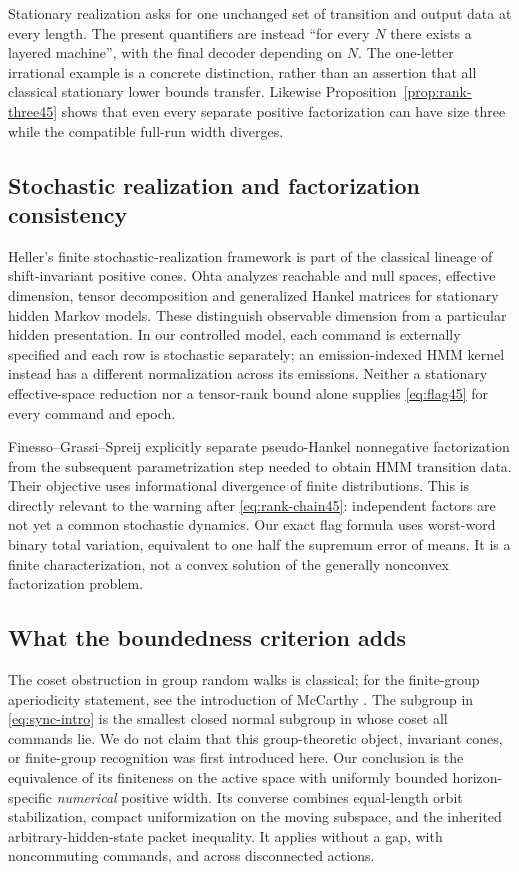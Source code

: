 Stationary realization asks for one unchanged set of transition and output data at every length. The present quantifiers are instead ``for every $N$ there exists a layered machine'', with the final decoder depending on $N$. The one-letter irrational example is a concrete distinction, rather than an assertion that all classical stationary lower bounds transfer. Likewise Proposition~\ref{prop:rank-three45} shows that even every separate positive factorization can have size three while the compatible full-run width diverges.

\subsection{Stochastic realization and factorization consistency}
Heller's finite stochastic-realization framework \cite{Heller} is part of the classical lineage of shift-invariant positive cones. Ohta \cite[Theorems 6--9 and Remark 10]{Ohta} analyzes reachable and null spaces, effective dimension, tensor decomposition and generalized Hankel matrices for stationary hidden Markov models. These distinguish observable dimension from a particular hidden presentation. In our controlled model, each command is externally specified and each row is stochastic separately; an emission-indexed HMM kernel instead has a different normalization across its emissions. Neither a stationary effective-space reduction nor a tensor-rank bound alone supplies \eqref{eq:flag45} for every command and epoch.

Finesso--Grassi--Spreij \cite[Section IV]{FGS} explicitly separate pseudo-Hankel nonnegative factorization from the subsequent parametrization step needed to obtain HMM transition data. Their objective uses informational divergence of finite distributions. This is directly relevant to the warning after \eqref{eq:rank-chain45}: independent factors are not yet a common stochastic dynamics. Our exact flag formula uses worst-word binary total variation, equivalent to one half the supremum error of means. It is a finite characterization, not a convex solution of the generally nonconvex factorization problem.

\subsection{What the boundedness criterion adds}
The coset obstruction in group random walks is classical; for the finite-group aperiodicity statement, see the introduction of McCarthy \cite{McCarthy}. The subgroup in \eqref{eq:sync-intro} is the smallest closed normal subgroup in whose coset all commands lie. We do not claim that this group-theoretic object, invariant cones, or finite-group recognition was first introduced here. Our conclusion is the equivalence of its finiteness on the active space with uniformly bounded horizon-specific \emph{numerical} positive width. Its converse combines equal-length orbit stabilization, compact uniformization on the moving subspace, and the inherited arbitrary-hidden-state packet inequality. It applies without a gap, with noncommuting commands, and across disconnected actions.


